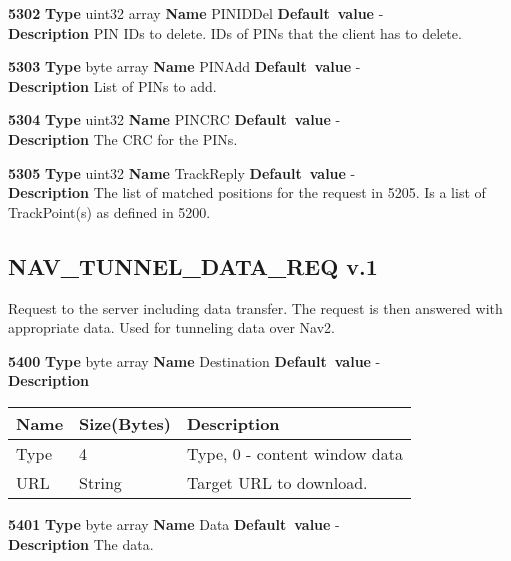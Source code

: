 \documentclass[a4paper]{article}
\begin{document}
\begin{list}{\textbf{ParamID}}{}
\item \textbf{5302} \textbf{Type} uint32 array \textbf{Name} PINIDDel
                 \textbf{Default~value} - \\
  \label{track_rep:PINIDDel}
  \textbf{Description} PIN IDs to delete. IDs of PINs that the client has 
                       to delete.
\item \textbf{5303} \textbf{Type} byte array \textbf{Name} PINAdd
                 \textbf{Default~value} - \\
  \label{track_rep:PINAdd}
  \textbf{Description} List of PINs to add.
\item \textbf{5304} \textbf{Type} uint32 \textbf{Name} PINCRC
                 \textbf{Default~value} - \\
  \label{track_rep:PINCRC}
  \textbf{Description} The CRC for the PINs.
\item \textbf{5305} \textbf{Type} uint32 \textbf{Name} TrackReply
                 \textbf{Default~value} - \\
  \label{TrackReply}
  \textbf{Description} The list of matched positions for the request in 5205.
                       Is a list of TrackPoint(s) as defined in 5200.
\end{list}

\subsection{NAV\_TUNNEL\_DATA\_REQ v.1}
\label{NAV_TUNNEL_DATA_REQ}

Request to the server including data transfer. The request is then answered
with appropriate data. Used for tunneling data over Nav2.

\begin{list}{\textbf{ParamID}}{}
\item \textbf{5400} \textbf{Type} byte array \textbf{Name} Destination
                 \textbf{Default~value} - \\
  \label{tunnel_req:Destination}
  \textbf{Description} \\
  \begin{tabular}{|l|l|p{60mm}|}
    \hline
    Name    & Size(Bytes) & Description \\\hline
    Type    & 4           & Type, 0 - content window data \\\hline
    URL     & String      & Target URL to download. \\\hline
  \end{tabular}
\item \textbf{5401} \textbf{Type} byte array \textbf{Name} Data
                 \textbf{Default~value} - \\
  \textbf{Description} The data.
\end{list}
 
\end{document}
